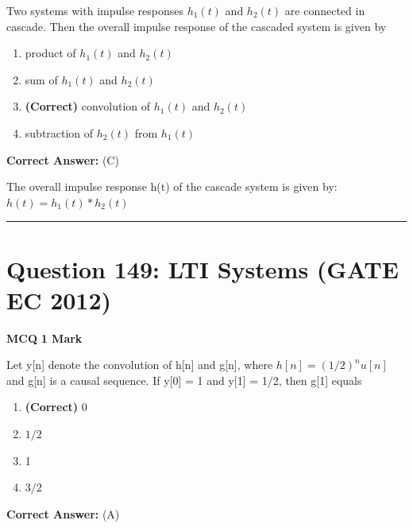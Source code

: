 \documentclass[11pt,a4paper]{article}
\begin{document}
\noindent Two systems with impulse responses $h_{1}\left ( t \right )$ and $h_{2}\left ( t \right )$ are connected in cascade. Then the overall impulse response of the cascaded system is given by


\begin{enumerate}[label=(\Alph*)]
    \item product of $h_{1}\left ( t \right )$ and $h_{2}\left ( t \right )$
    \item sum of $h_{1}\left ( t \right )$ and $h_{2}\left ( t \right )$
    \item \textbf{(Correct)} convolution of $h_{1}\left ( t \right )$ and $h_{2}\left ( t \right )$
    \item subtraction of $h_{2}\left ( t \right )$ from $h_{1}\left ( t \right )$
\end{enumerate}

\noindent \textbf{Correct Answer:} (C)

\begin{tcolorbox}[solbox, title=Detailed Solution -- Question 148]
The overall impulse response h(t) of the cascade
system is given by:
$h(t)=h_{1}(t) * h_{2}(t)$
\end{tcolorbox}

\vspace{1.5em}
\hrule
\vspace{1.5em}

\section*{Question 149: LTI Systems (GATE EC 2012)}
\noindent \textbf{\color{primary}MCQ} \hfill \textbf{\color{secondary}1 Mark}


\noindent Let y[n] denote the convolution of h[n] and g[n], where $h[n]=(1/2)^{n}u[n]$ and g[n] is a causal sequence. If y[0] = 1 and y[1] = 1/2, then g[1] equals


\begin{enumerate}[label=(\Alph*)]
    \item \textbf{(Correct)} 0
    \item $1/2$
    \item 1
    \item $3/2$
\end{enumerate}

\noindent \textbf{Correct Answer:} (A)
\end{document}
